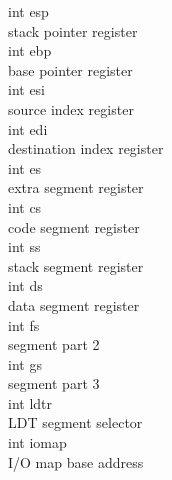 \documentclass{swfcthesis}
\begin{document}
\begin{enumerate}
  \hspace*{1cm} int esp\\
  \hspace*{1.5cm}  stack pointer register\\
  \hspace*{1cm} int ebp\\
  \hspace*{1.5cm}  base pointer register\\
  \hspace*{1cm} int esi\\
  \hspace*{1.5cm} source index register\\
  \hspace*{1cm} int edi\\
  \hspace*{1.5cm}destination index register \\
  \hspace*{1cm} int es\\
  \hspace*{1.5cm}  extra segment register\\
  \hspace*{1cm} int cs\\
  \hspace*{1.5cm} code segment register\\
  \hspace*{1cm} int ss\\
  \hspace*{1.5cm} stack segment register\\
  \hspace*{1cm} int ds\\
  \hspace*{1.5cm} data segment register\\
  \hspace*{1cm} int fs\\
  \hspace*{1.5cm}  segment part 2\\
  \hspace*{1cm} int gs\\
  \hspace*{1.5cm} segment part 3\\
  \hspace*{1cm} int ldtr\\
  \hspace*{1.5cm}  LDT segment selector\\
  \hspace*{1cm} int iomap\\
  \hspace*{1.5cm} I/O map base address\\


\end{enumerate}
\end{document}
